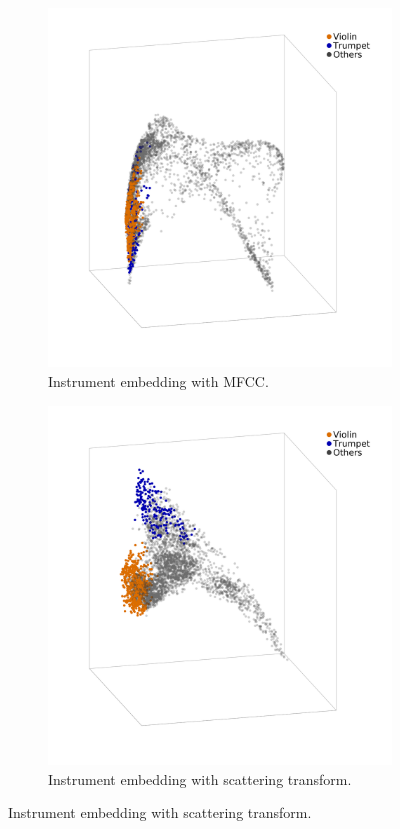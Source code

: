 \begin{figure}
        \begin{subfigure}{0.45\textwidth}
                \centering
                \includegraphics[width=\linewidth]{./figs/embeddings/mf_inst_two_dmap.png}
                \caption{Instrument embedding with MFCC.}
                \label{fig:mf_inst_two_dmap}
        \end{subfigure}%
        \begin{subfigure}{0.45\textwidth}
                \centering
                \includegraphics[width=\linewidth]{./figs/embeddings/sc_inst_two_dmap.png}
                \caption{Instrument embedding with scattering transform.}
                \label{fig:sc_inst_two_dmap}
        \end{subfigure}%


\end{figure}
